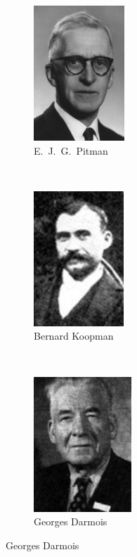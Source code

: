 \documentclass[12pt]{article}
\begin{document}
\begin{figure}
    \centering
    \begin{subfigure}[t]{0.33\textwidth}
        \centering
        \includegraphics[height=2in]{pitman.jpg}
        \caption*{E.\ J.\ G.\ Pitman}
    \end{subfigure}%
    ~ 
    \begin{subfigure}[t]{0.33\textwidth}
        \centering
        \includegraphics[height=2in]{koopman.jpg}
        \caption*{Bernard Koopman}
    \end{subfigure}%
    ~
    \begin{subfigure}[t]{0.33\textwidth}
        \centering
        \includegraphics[height=2in]{darmois.jpg}
        \caption*{Georges Darmois}
    \end{subfigure}
\end{figure}
\end{document}
